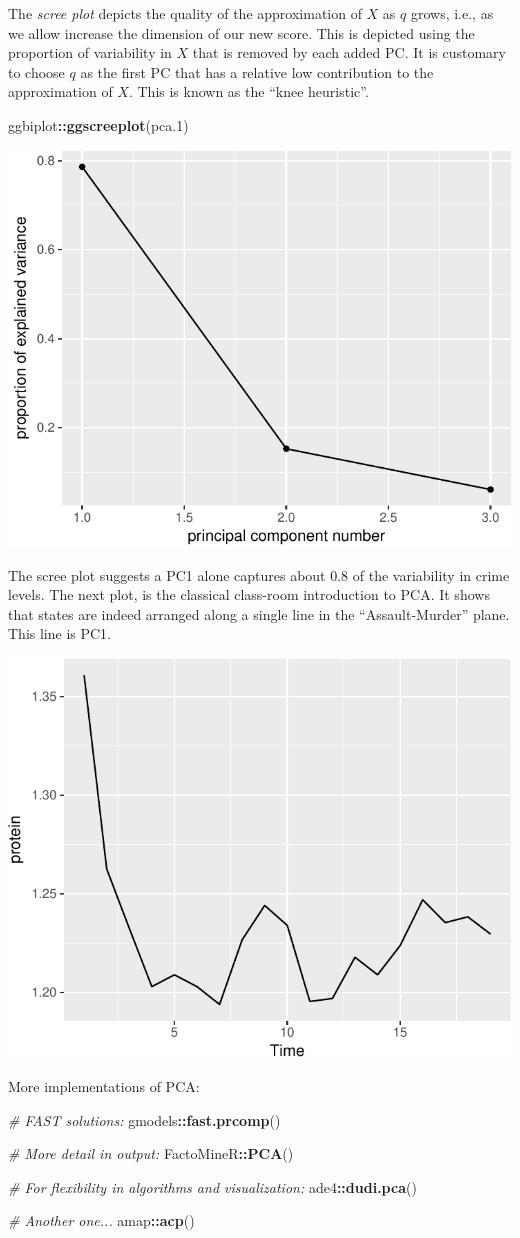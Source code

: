 \documentclass[]{book}
\newenvironment{Shaded}{\begin{snugshade}}{\end{snugshade}}
\newcommand{\CommentTok}[1]{\textcolor[rgb]{0.56,0.35,0.01}{\textit{#1}}}
\newcommand{\FloatTok}[1]{\textcolor[rgb]{0.00,0.00,0.81}{#1}}
\newcommand{\KeywordTok}[1]{\textcolor[rgb]{0.13,0.29,0.53}{\textbf{#1}}}
\newcommand{\NormalTok}[1]{#1}
\newcommand{\OperatorTok}[1]{\textcolor[rgb]{0.81,0.36,0.00}{\textbf{#1}}}
\theoremstyle{definition}
\theoremstyle{definition}
\theoremstyle{definition}
\theoremstyle{remark}
\begin{document}
The \emph{scree plot} depicts the quality of the approximation of \(X\) as \(q\) grows, i.e., as we allow increase the dimension of our new score.
This is depicted using the proportion of variability in \(X\) that is removed by each added PC.
It is customary to choose \(q\) as the first PC that has a relative low contribution to the approximation of \(X\).
This is known as the ``knee heuristic''.

\begin{Shaded}
\begin{Highlighting}[]
\NormalTok{ggbiplot}\OperatorTok{::}\KeywordTok{ggscreeplot}\NormalTok{(pca}\FloatTok{.1}\NormalTok{)}
\end{Highlighting}
\end{Shaded}

\includegraphics[width=0.5\linewidth]{Rcourse_files/figure-latex/scree-1}

The scree plot suggests a PC1 alone captures about 0.8 of the variability in crime levels.
The next plot, is the classical class-room introduction to PCA.
It shows that states are indeed arranged along a single line in the ``Assault-Murder'' plane. This line is PC1.

\includegraphics[width=0.5\linewidth]{Rcourse_files/figure-latex/unnamed-chunk-253-1}

More implementations of PCA:

\begin{Shaded}
\begin{Highlighting}[]
\CommentTok{# FAST solutions:}
\NormalTok{gmodels}\OperatorTok{::}\KeywordTok{fast.prcomp}\NormalTok{()}

\CommentTok{# More detail in output:}
\NormalTok{FactoMineR}\OperatorTok{::}\KeywordTok{PCA}\NormalTok{()}

\CommentTok{# For flexibility in algorithms and visualization:}
\NormalTok{ade4}\OperatorTok{::}\KeywordTok{dudi.pca}\NormalTok{()}

\CommentTok{# Another one...}
\NormalTok{amap}\OperatorTok{::}\KeywordTok{acp}\NormalTok{()}
\end{Highlighting}
\end{Shaded}
\end{document}
